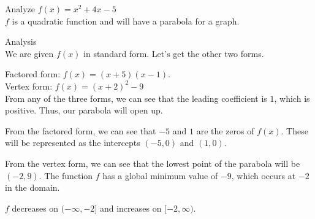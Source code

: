 \documentclass{ximera}
\begin{document}
\begin{example}   Analyze $f(x) = x^2 + 4x - 5$ \\ 


$f$ is a quadratic function and will have a parabola for a graph.

\begin{explanation} Analysis \\


We are given $f(x)$ in standard form.  Let's get the other two forms.

Factored form: $f(x) = (x+5)(x-1)$. \\

Vertex form: $f(x) = (x+2)^2 - 9$ \\


From any of the three forms, we can see that the leading coefficient is $1$, which is positive.  Thus, our parabola will open up.


From the factored form, we can see that $-5$ and $1$ are the zeros of $f(x)$.  These will be represented as the intercepts $(-5, 0)$ and $(1,0)$.


From the vertex form, we can see that the lowest point of the parabola will be $(-2, 9)$.  The function $f$ has a global minimum value of $-9$, which occurs at $-2$ in the domain.




\begin{image}
\end{image}



$f$ decreases on $(-\infty, -2]$ and increases on $[-2, \infty)$.






\end{explanation}

\end{example}
\end{document}
